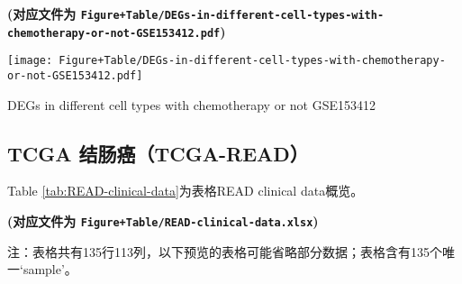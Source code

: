\documentclass[
]{article}
\begin{document}
\textbf{(对应文件为 \texttt{Figure+Table/DEGs-in-different-cell-types-with-chemotherapy-or-not-GSE153412.pdf})}

\def\@captype{figure}
\begin{center}
\texttt{[image: Figure+Table/DEGs-in-different-cell-types-with-chemotherapy-or-not-GSE153412.pdf]}
\caption{DEGs in different cell types with chemotherapy or not GSE153412}\label{fig:DEGs-in-different-cell-types-with-chemotherapy-or-not-GSE153412}
\end{center}

\hypertarget{tcga-ux7ed3ux80a0ux764ctcga-read}{%
\subsection{TCGA 结肠癌（TCGA-READ）}\label{tcga-ux7ed3ux80a0ux764ctcga-read}}

Table \ref{tab:READ-clinical-data}为表格READ clinical data概览。

\textbf{(对应文件为 \texttt{Figure+Table/READ-clinical-data.xlsx})}

\begin{center}\begin{tcolorbox}[colback=gray!10, colframe=gray!50, width=0.9\linewidth, arc=1mm, boxrule=0.5pt]注：表格共有135行113列，以下预览的表格可能省略部分数据；表格含有135个唯一`sample'。
\end{tcolorbox}
\end{center}
\end{document}
